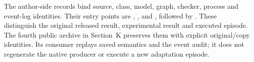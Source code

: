 The author-side records bind source, class, model, graph, checker,
process and event-log identities. Their entry points are
,
, and
, followed by
.
These distinguish the original released result, experimental result
and executed episode. The fourth public archive in Section~K
preserves them with explicit original/copy identities. Its consumer
replays saved semantics and the event audit; it does not regenerate
the native producer or execute a new adaptation episode.
